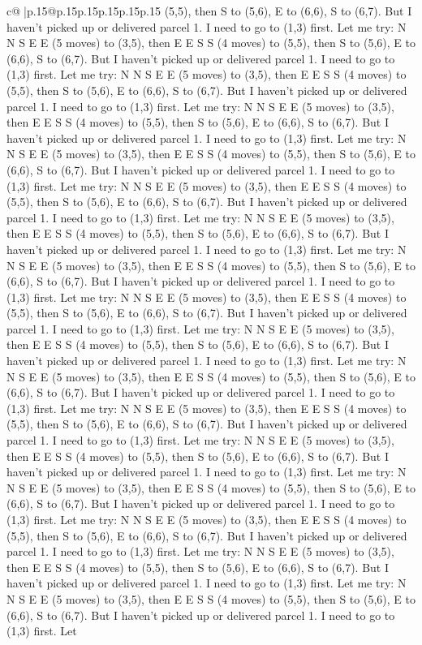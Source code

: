 \documentclass{article}
\begin{document}
{\begin{supertabular}{c@{$\;$}|p{.15\linewidth}@{}p{.15\linewidth}p{.15\linewidth}p{.15\linewidth}p{.15\linewidth}p{.15\linewidth}}
{{{(5,5), then S to (5,6), E to (6,6), S to (6,7). But I haven't picked up or delivered parcel 1. I need to go to (1,3) first. Let me try: N N S E E (5 moves) to (3,5), then E E S S (4 moves) to (5,5), then S to (5,6), E to (6,6), S to (6,7). But I haven't picked up or delivered parcel 1. I need to go to (1,3) first. Let me try: N N S E E (5 moves) to (3,5), then E E S S (4 moves) to (5,5), then S to (5,6), E to (6,6), S to (6,7). But I haven't picked up or delivered parcel 1. I need to go to (1,3) first. Let me try: N N S E E (5 moves) to (3,5), then E E S S (4 moves) to (5,5), then S to (5,6), E to (6,6), S to (6,7). But I haven't picked up or delivered parcel 1. I need to go to (1,3) first. Let me try: N N S E E (5 moves) to (3,5), then E E S S (4 moves) to (5,5), then S to (5,6), E to (6,6), S to (6,7). But I haven't picked up or delivered parcel 1. I need to go to (1,3) first. Let me try: N N S E E (5 moves) to (3,5), then E E S S (4 moves) to (5,5), then S to (5,6), E to (6,6), S to (6,7). But I haven't picked up or delivered parcel 1. I need to go to (1,3) first. Let me try: N N S E E (5 moves) to (3,5), then E E S S (4 moves) to (5,5), then S to (5,6), E to (6,6), S to (6,7). But I haven't picked up or delivered parcel 1. I need to go to (1,3) first. Let me try: N N S E E (5 moves) to (3,5), then E E S S (4 moves) to (5,5), then S to (5,6), E to (6,6), S to (6,7). But I haven't picked up or delivered parcel 1. I need to go to (1,3) first. Let me try: N N S E E (5 moves) to (3,5), then E E S S (4 moves) to (5,5), then S to (5,6), E to (6,6), S to (6,7). But I haven't picked up or delivered parcel 1. I need to go to (1,3) first. Let me try: N N S E E (5 moves) to (3,5), then E E S S (4 moves) to (5,5), then S to (5,6), E to (6,6), S to (6,7). But I haven't picked up or delivered parcel 1. I need to go to (1,3) first. Let me try: N N S E E (5 moves) to (3,5), then E E S S (4 moves) to (5,5), then S to (5,6), E to (6,6), S to (6,7). But I haven't picked up or delivered parcel 1. I need to go to (1,3) first. Let me try: N N S E E (5 moves) to (3,5), then E E S S (4 moves) to (5,5), then S to (5,6), E to (6,6), S to (6,7). But I haven't picked up or delivered parcel 1. I need to go to (1,3) first. Let me try: N N S E E (5 moves) to (3,5), then E E S S (4 moves) to (5,5), then S to (5,6), E to (6,6), S to (6,7). But I haven't picked up or delivered parcel 1. I need to go to (1,3) first. Let me try: N N S E E (5 moves) to (3,5), then E E S S (4 moves) to (5,5), then S to (5,6), E to (6,6), S to (6,7). But I haven't picked up or delivered parcel 1. I need to go to (1,3) first. Let me try: N N S E E (5 moves) to (3,5), then E E S S (4 moves) to (5,5), then S to (5,6), E to (6,6), S to (6,7). But I haven't picked up or delivered parcel 1. I need to go to (1,3) first. Let me try: N N S E E (5 moves) to (3,5), then E E S S (4 moves) to (5,5), then S to (5,6), E to (6,6), S to (6,7). But I haven't picked up or delivered parcel 1. I need to go to (1,3) first. Let me try: N N S E E (5 moves) to (3,5), then E E S S (4 moves) to (5,5), then S to (5,6), E to (6,6), S to (6,7). But I haven't picked up or delivered parcel 1. I need to go to (1,3) first. Let }}}
\end{supertabular}}
\end{document}

